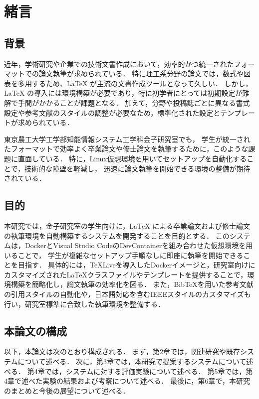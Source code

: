 \documentclass[main]{subfiles}
\begin{document}
\chapter{緒言}
\section{背景}
近年，学術研究や企業での技術文書作成において，効率的かつ統一されたフォーマットでの論文執筆が求められている．
特に理工系分野の論文では，数式や図表を多用するため、{\LaTeX} が主流の文書作成ツールとなって久しい．
しかし，{\LaTeX} の導入には環境構築が必要であり，特に初学者にとっては初期設定が難解で手間がかかることが課題となる．
加えて，分野や投稿誌ごとに異なる書式設定や参考文献のスタイルの調整が必要なため，標準化された設定とテンプレートが求められている．

東京農工大学工学部知能情報システム工学科金子研究室でも，
学生が統一されたフォーマットで効率よく卒業論文や修士論文を執筆するために，このような課題に直面している．
特に，Linux仮想環境を用いてセットアップを自動化することで，技術的な障壁を軽減し，
迅速に論文執筆を開始できる環境の整備が期待されている．

\section{目的}
本研究では，金子研究室の学生向けに，{\LaTeX} による卒業論文および修士論文の執筆環境を自動構築するシステムを開発することを目的とする．
このシステムは，DockerとVisual Studio CodeのDevContainerを組み合わせた仮想環境を用いることで，
学生が複雑なセットアップ手順なしに即座に執筆を開始できることを目指す．
具体的には，{\TeX}Liveを導入したDockerイメージと，研究室向けにカスタマイズされた{\LaTeX}クラスファイルやテンプレートを提供することで，環境構築を簡略化し，論文執筆の効率化を図る．
また，Bib{\TeX}を用いた参考文献の引用スタイルの自動化や，日本語対応を含むIEEEスタイルのカスタマイズも行い，研究室標準に合致した執筆環境を整備する．

\section{本論文の構成}
以下，本論文は次のとおり構成される．
まず，第2章では，関連研究や既存システムについて述べる．
次に，第3章では，本研究で提案するシステムについて述べる．
第4章では，システムに対する評価実験について述べる．
第5章では，第4章で述べた実験の結果および考察について述べる．
最後に，第6章で，本研究のまとめと今後の展望について述べる．
\end{document}
